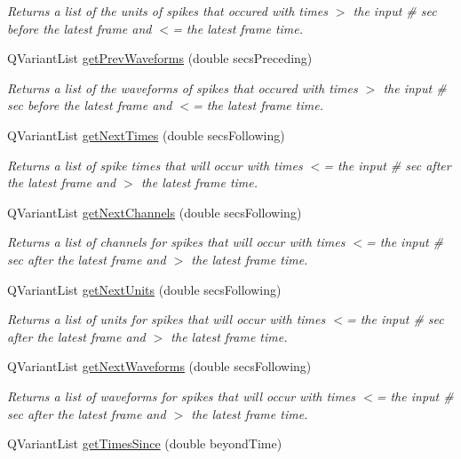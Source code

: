 \begin{DoxyCompactItemize}
\begin{DoxyCompactList}\small\item\em Returns a list of the units of spikes that occured with times $>$ the input \# sec before the latest frame and $<$= the latest frame time. \end{DoxyCompactList}\item 
Q\-Variant\-List \hyperlink{class_picto_1_1_analysis_spike_data_afd0f2d38028b3f6fef76e2d6eae6f2d6}{get\-Prev\-Waveforms} (double secs\-Preceding)
\begin{DoxyCompactList}\small\item\em Returns a list of the waveforms of spikes that occured with times $>$ the input \# sec before the latest frame and $<$= the latest frame time. \end{DoxyCompactList}\item 
Q\-Variant\-List \hyperlink{class_picto_1_1_analysis_spike_data_ae0829d9e6cde9e3c80f86f95beb48543}{get\-Next\-Times} (double secs\-Following)
\begin{DoxyCompactList}\small\item\em Returns a list of spike times that will occur with times $<$= the input \# sec after the latest frame and $>$ the latest frame time. \end{DoxyCompactList}\item 
Q\-Variant\-List \hyperlink{class_picto_1_1_analysis_spike_data_a403275bcc56f351df1290dffb4dd2a19}{get\-Next\-Channels} (double secs\-Following)
\begin{DoxyCompactList}\small\item\em Returns a list of channels for spikes that will occur with times $<$= the input \# sec after the latest frame and $>$ the latest frame time. \end{DoxyCompactList}\item 
Q\-Variant\-List \hyperlink{class_picto_1_1_analysis_spike_data_af7bcca3f9facb8503d690bf58abf8653}{get\-Next\-Units} (double secs\-Following)
\begin{DoxyCompactList}\small\item\em Returns a list of units for spikes that will occur with times $<$= the input \# sec after the latest frame and $>$ the latest frame time. \end{DoxyCompactList}\item 
Q\-Variant\-List \hyperlink{class_picto_1_1_analysis_spike_data_a40d43d9fb67ac53fe348ac695688bc05}{get\-Next\-Waveforms} (double secs\-Following)
\begin{DoxyCompactList}\small\item\em Returns a list of waveforms for spikes that will occur with times $<$= the input \# sec after the latest frame and $>$ the latest frame time. \end{DoxyCompactList}\item 
\hypertarget{class_picto_1_1_analysis_spike_data_a3659fccec5dc5311ba17652cad81f65f}{Q\-Variant\-List \hyperlink{class_picto_1_1_analysis_spike_data_a3659fccec5dc5311ba17652cad81f65f}{get\-Times\-Since} (double beyond\-Time)}\label{class_picto_1_1_analysis_spike_data_a3659fccec5dc5311ba17652cad81f65f}


\end{DoxyCompactItemize}
